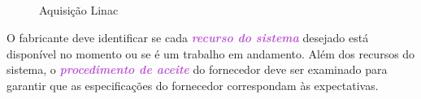 \documentclass[11pt,a4paper]{article}
\begin{document}
	\begin{figure}[!h]
		\centering

		 \\ %
		 \\%
		 \\%
		 \\%
		\caption{Aquisição Linac}
		\label{fig:aquisicaoLinac}
	\end{figure}

	O fabricante deve identificar se cada \textcolor{MediumOrchid}{\textbf{\textit{recurso do sistema}}} desejado está disponível no momento ou se é um trabalho em andamento. Além dos recursos do sistema, o \textcolor{MediumOrchid}{\textbf{\textit{procedimento de aceite}}} do fornecedor deve ser examinado para garantir que as especificações do fornecedor correspondam às expectativas.
\end{document}
